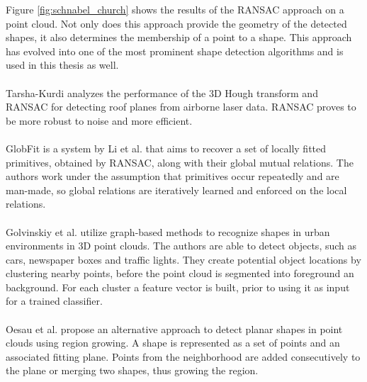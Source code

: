 Figure \ref{fig:schnabel_church} shows the results of the RANSAC approach on a point cloud. Not only does this approach provide the geometry of the detected shapes, it also determines the membership of a point to a shape. This approach has evolved into one of the most prominent shape detection algorithms and is used in this thesis as well. 
\\
\\
Tarsha-Kurdi \cite{tarsha2007hough} analyzes the performance of the 3D Hough transform and RANSAC for detecting roof planes from airborne laser data. RANSAC proves to be more robust to noise and more efficient.
\\
\\
GlobFit is a system by Li et al. \cite{li2011globfit} that aims to recover a set of locally fitted primitives, obtained by RANSAC, along with their global mutual relations. The authors work under the assumption that primitives occur repeatedly and are man-made, so global relations are iteratively learned and enforced on the local relations. 
\\
\\
Golvinskiy et al. \cite{golovinskiy2009shape} utilize graph-based methods to recognize shapes in urban environments in 3D point clouds. The authors are able to detect objects, such as cars, newspaper boxes and traffic lights. They create potential object locations by clustering nearby points, before the point cloud is segmented into foreground an background. For each cluster a feature vector is built, prior to using it as input for a trained classifier. 
\\
\\
Oesau et al. \cite{oesau2016planar} propose an alternative approach to detect planar shapes in point clouds using region growing. A shape is represented as a set of points and an associated fitting plane. Points from the neighborhood are added consecutively to the plane or merging two shapes, thus growing the region. 
